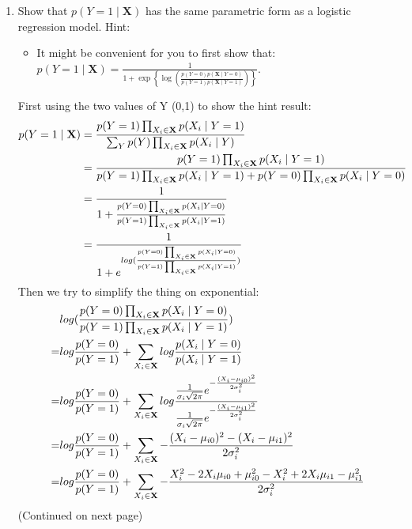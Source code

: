 \documentclass[11pt]{article}
\renewcommand{\vec}[1]{\mathbf{#1}}
\begin{document}
\begin{enumerate}
\item Show that $p(Y = 1 \mid \vec{X})$ has the same parametric form as a logistic regression model.
Hint:
\begin{itemize}
\item It might be convenient for you to first show that:
$p(Y = 1 \mid \vec{X}) = \frac{1}{1 + \exp\left\{ \log \left( \frac{ p(Y=0) p(\vec{X} \mid Y=0) }{ p(Y=1) p(\vec{X} \mid Y=1) } \right) \right\}}$.
\end{itemize}

\begin{answertext}{15cm}{}
First using the two values of Y (0,1) to show the hint result:
\begin{align}
p(Y=1 \mid \vec{X}) &=
\frac{
p(Y=1) \prod_{X_i \in \vec{X}} p(X_i \mid Y=1)
}{
\sum_Y p(Y) \prod_{X_i \in \vec{X}} p(X_i \mid Y)
} \notag\\
&=\frac{
p(Y=1) \prod_{X_i \in \vec{X}} p(X_i \mid Y=1)
}{
p(Y=1) \prod_{X_i \in \vec{X}} p(X_i \mid Y=1) + p(Y=0) \prod_{X_i \in \vec{X}} p(X_i \mid Y=0)
} \notag\\
&=\frac{1}{1+ \frac{p(Y=0) \prod_{X_i \in \vec{X}} p(X_i \mid Y=0)}{p(Y=1) \prod_{X_i \in \vec{X}} p(X_i \mid Y=1)}} \notag \\
&=\frac{1}{1+ e^{log(\frac{p(Y=0) \prod_{X_i \in \vec{X}} p(X_i \mid Y=0)}{p(Y=1) \prod_{X_i \in \vec{X}} p(X_i \mid Y=1)})}} \notag
\end{align}
Then we try to simplify the thing on exponential:
\begin{align}
&log(\frac{p(Y=0) \prod_{X_i \in \vec{X}} p(X_i \mid Y=0)}{p(Y=1) \prod_{X_i \in \vec{X}} p(X_i \mid Y=1)}) \notag\\
=& log\frac{p(Y=0)}{p(Y=1)} + \sum_{X_i \in \vec{X}}log\frac{p(X_i \mid Y=0)}{p(X_i \mid Y=1)} \notag \\
=& log\frac{p(Y=0)}{p(Y=1)} + \sum_{X_i \in \vec{X}}log\frac{\frac{1}{\sigma_{i}\sqrt{2 \pi}}e^{-\frac{(X_i - \mu_{i0})^2}{2\sigma_{i}^2}}}{\frac{1}{\sigma_{i}\sqrt{2 \pi}}e^{-\frac{(X_i - \mu_{i1})^2}{2\sigma_{i}^2}}} \notag \\
=& log\frac{p(Y=0)}{p(Y=1)} + \sum_{X_i \in \vec{X}}-\frac{(X_i - \mu_{i0})^2 - (X_i - \mu_{i1})^2}{2\sigma_{i}^2}\notag \\
=& log\frac{p(Y=0)}{p(Y=1)} + \sum_{X_i \in \vec{X}}-\frac{X_i^2 - 2 X_i \mu_{i0} + \mu_{i0}^2 - X_i^2 + 2 X_i \mu_{i1} - \mu_{i1}^2}{2\sigma_{i}^2}\notag 
\end{align}
(Continued on next page)
\end{answertext}

\end{enumerate}
\end{document}
